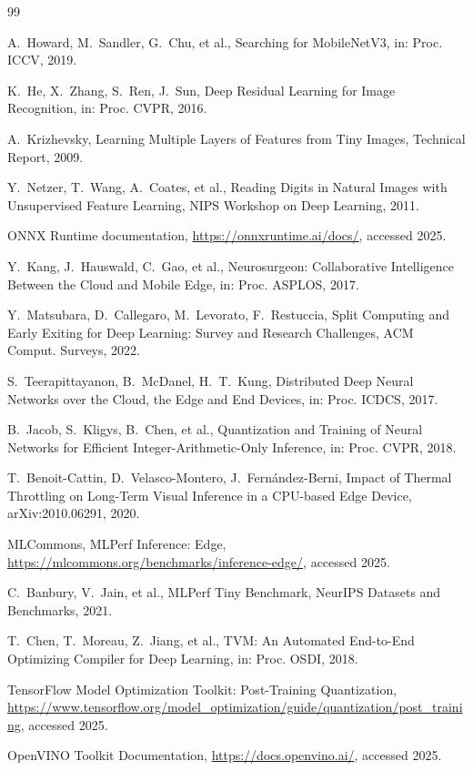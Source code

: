 \documentclass[review]{elsarticle}
\begin{document}

\begin{thebibliography}{99}

A.~Howard, M.~Sandler, G.~Chu, et al.,
Searching for MobileNetV3,
in: Proc. ICCV, 2019.

K.~He, X.~Zhang, S.~Ren, J.~Sun,
Deep Residual Learning for Image Recognition,
in: Proc. CVPR, 2016.

A.~Krizhevsky,
Learning Multiple Layers of Features from Tiny Images,
Technical Report, 2009.

Y.~Netzer, T.~Wang, A.~Coates, et al.,
Reading Digits in Natural Images with Unsupervised Feature Learning,
NIPS Workshop on Deep Learning, 2011.

ONNX Runtime documentation,
\url{https://onnxruntime.ai/docs/}, accessed 2025.

Y.~Kang, J.~Hauswald, C.~Gao, et al.,
Neurosurgeon: Collaborative Intelligence Between the Cloud and Mobile Edge,
in: Proc. ASPLOS, 2017.

Y.~Matsubara, D.~Callegaro, M.~Levorato, F.~Restuccia,
Split Computing and Early Exiting for Deep Learning: Survey and Research Challenges,
ACM Comput. Surveys, 2022.

S.~Teerapittayanon, B.~McDanel, H.~T.~Kung,
Distributed Deep Neural Networks over the Cloud, the Edge and End Devices,
in: Proc. ICDCS, 2017.

B.~Jacob, S.~Kligys, B.~Chen, et al.,
Quantization and Training of Neural Networks for Efficient Integer-Arithmetic-Only Inference,
in: Proc. CVPR, 2018.

T.~Benoit-Cattin, D.~Velasco-Montero, J.~Fernández-Berni,
Impact of Thermal Throttling on Long-Term Visual Inference in a CPU-based Edge Device,
arXiv:2010.06291, 2020.

MLCommons,
MLPerf Inference: Edge,
\url{https://mlcommons.org/benchmarks/inference-edge/}, accessed 2025.

C.~Banbury, V.~Jain, et al.,
MLPerf Tiny Benchmark,
NeurIPS Datasets and Benchmarks, 2021.

T.~Chen, T.~Moreau, Z.~Jiang, et al.,
TVM: An Automated End-to-End Optimizing Compiler for Deep Learning,
in: Proc. OSDI, 2018.

TensorFlow Model Optimization Toolkit: Post-Training Quantization,
\url{https://www.tensorflow.org/model_optimization/guide/quantization/post_training}, accessed 2025.

OpenVINO Toolkit Documentation,
\url{https://docs.openvino.ai/}, accessed 2025.

\end{thebibliography}
\end{document}
